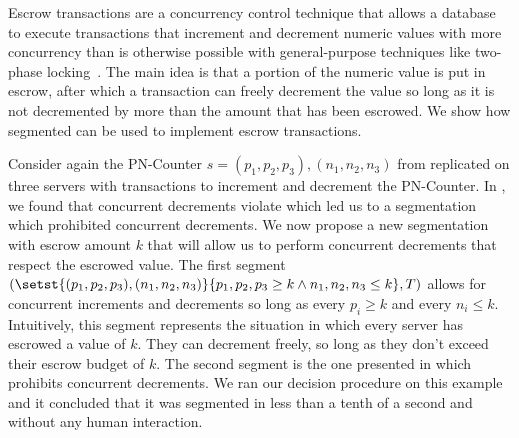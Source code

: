 Escrow transactions are a concurrency control technique that allows a database
to execute transactions that increment and decrement numeric values with more
concurrency than is otherwise possible with general-purpose techniques like
two-phase locking~\cite{o1986escrow}. The main idea is that a portion of the
numeric value is put in escrow, after which a transaction can freely decrement
the value so long as it is not decremented by more than the amount that has
been escrowed. We show how segmented \invariantconfluence{} can be used to
implement escrow transactions.

Consider again the PN-Counter $s = (p_1, p_2, p_3), (n_1, n_2, n_3)$ from
 replicated on three servers with transactions
to increment and decrement the PN-Counter. In
, we found that concurrent decrements violate
\invariantconfluence{} which led us to a segmentation which prohibited
concurrent decrements. We now propose a new segmentation with escrow amount $k$
that will allow us to perform concurrent decrements that respect the escrowed
value. The first segment $(\setst{(p_1, p_2, p_3), (n_1, n_2, n_3)}{p_1, p_2,
p_3 \geq k \land n_1, n_2, n_3 \leq k}, T)$ allows for concurrent increments
and decrements so long as every $p_i \geq k$ and every $n_i \leq k$.
Intuitively, this segment represents the situation in which every server has
escrowed a value of $k$. They can decrement freely, so long as they don't
exceed their escrow budget of $k$. The second segment is the one presented in
 which prohibits concurrent decrements. We ran
our decision procedure on this example and it concluded that it was segmented
\invariantconfluent{} in less than a tenth of a second and without any human
interaction.

